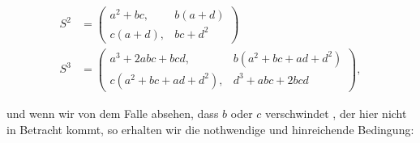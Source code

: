 \[
\begin{aligned}
S^2 &= \begin{pmatrix} a^2 + bc, & b(a+d) \\ c(a+d), & bc + d^2 \end{pmatrix} \\
S^3 &= \begin{pmatrix} a^3 + 2abc + bcd, & b(a^2+bc+ad+d^2) \\ c(a^2+bc+ad+d^2), & d^3+abc+2bcd \end{pmatrix},
\end{aligned}
\]

und wenn wir von dem Falle absehen, dass $b$ oder $c$ verschwindet
, der hier nicht in Betracht kommt, so erhalten wir die
nothwendige und hinreichende Bedingung:
